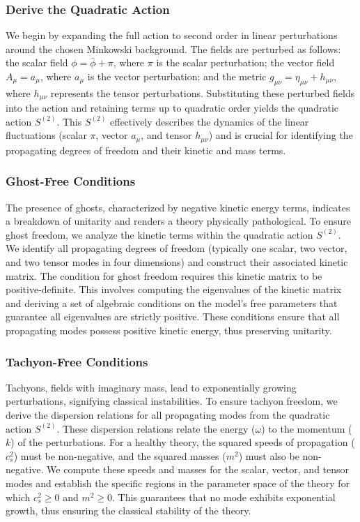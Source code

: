 \documentclass[twocolumn]{aastex631}
\begin{document}
\subsubsection{Derive the Quadratic Action}
We begin by expanding the full action to second order in linear perturbations around the chosen Minkowski background. The fields are perturbed as follows: the scalar field $\phi = \bar{\phi} + \pi$, where $\pi$ is the scalar perturbation; the vector field $A_\mu = a_\mu$, where $a_\mu$ is the vector perturbation; and the metric $g_{\mu\nu} = \eta_{\mu\nu} + h_{\mu\nu}$, where $h_{\mu\nu}$ represents the tensor perturbations. Substituting these perturbed fields into the action and retaining terms up to quadratic order yields the quadratic action $S^{(2)}$. This $S^{(2)}$ effectively describes the dynamics of the linear fluctuations (scalar $\pi$, vector $a_\mu$, and tensor $h_{\mu\nu}$) and is crucial for identifying the propagating degrees of freedom and their kinetic and mass terms.

\subsubsection{Ghost-Free Conditions}
The presence of ghosts, characterized by negative kinetic energy terms, indicates a breakdown of unitarity and renders a theory physically pathological. To ensure ghost freedom, we analyze the kinetic terms within the quadratic action $S^{(2)}$. We identify all propagating degrees of freedom (typically one scalar, two vector, and two tensor modes in four dimensions) and construct their associated kinetic matrix. The condition for ghost freedom requires this kinetic matrix to be positive-definite. This involves computing the eigenvalues of the kinetic matrix and deriving a set of algebraic conditions on the model's free parameters that guarantee all eigenvalues are strictly positive. These conditions ensure that all propagating modes possess positive kinetic energy, thus preserving unitarity.

\subsubsection{Tachyon-Free Conditions}
Tachyons, fields with imaginary mass, lead to exponentially growing perturbations, signifying classical instabilities. To ensure tachyon freedom, we derive the dispersion relations for all propagating modes from the quadratic action $S^{(2)}$. These dispersion relations relate the energy ($\omega$) to the momentum ($k$) of the perturbations. For a healthy theory, the squared speeds of propagation ($c_s^2$) must be non-negative, and the squared masses ($m^2$) must also be non-negative. We compute these speeds and masses for the scalar, vector, and tensor modes and establish the specific regions in the parameter space of the theory for which $c_s^2 \ge 0$ and $m^2 \ge 0$. This guarantees that no mode exhibits exponential growth, thus ensuring the classical stability of the theory.
\end{document}
